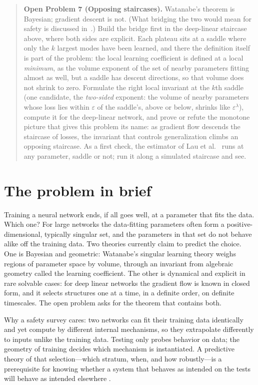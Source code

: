 \documentclass[11pt]{amsart}
\theoremstyle{plain}
\theoremstyle{definition}
\begin{document}
\begin{quote}
\textbf{Open Problem 7 (Opposing staircases).}
Watanabe's theorem is Bayesian; gradient descent is not. (What bridging the two would mean for safety is discussed in~\cite{lehalleur2025}.) Build the bridge first in the deep-linear staircase above, where both sides are explicit. Each plateau sits at a saddle where only the $k$ largest modes have been learned, and there the definition itself is part of the problem: the local learning coefficient is defined at a local \emph{minimum}, as the volume exponent of the set of nearby parameters fitting almost as well, but a saddle has descent directions, so that volume does not shrink to zero. Formulate the right local invariant at the $k$th saddle (one candidate, the \emph{two-sided} exponent: the volume of nearby parameters whose loss lies within $\varepsilon$ of the saddle's, above or below, shrinks like $\varepsilon^{\lambda}$), compute it for the deep-linear network, and prove or refute the monotone picture that gives this problem its name: as gradient flow descends the staircase of losses, the invariant that controls generalization climbs an opposing staircase. As a first check, the estimator of Lau et al.~\cite{lau2023} runs at any parameter, saddle or not; run it along a simulated staircase and see.
\end{quote}


\section{The problem in brief}\label{sec:brief}

Training a neural network ends, if all goes well, at a parameter that fits the data. Which one? For large networks the data-fitting parameters often form a positive-dimensional, typically singular set, and the parameters in that set do not behave alike off the training data. Two theories currently claim to predict the choice. One is Bayesian and geometric: Watanabe's singular learning theory weighs regions of parameter space by volume, through an invariant from algebraic geometry called the learning coefficient. The other is dynamical and explicit in rare solvable cases: for deep linear networks the gradient flow is known in closed form, and it selects structures one at a time, in a definite order, on definite timescales. The open problem asks for the theorem that contains both.



Why a safety survey cares: two networks can fit their training data identically and yet compute by different internal mechanisms, so they extrapolate differently to inputs unlike the training data. Testing only probes behavior on data; the geometry of training decides which mechanism is instantiated. A predictive theory of that selection---which stratum, when, and how robustly---is a prerequisite for knowing whether a system that behaves as intended on the tests will behave as intended elsewhere \cite{lehalleur2025}.
\end{document}

